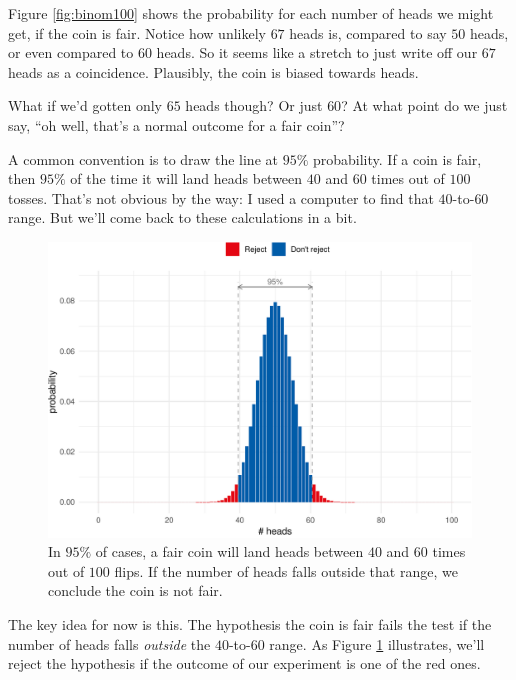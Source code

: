 \documentclass[justified]{tufte-book}
\theoremstyle{definition}
\theoremstyle{definition}
\theoremstyle{definition}
\theoremstyle{remark}
\begin{document}
Figure \ref{fig:binom100} shows the probability for each number of heads we might get, if the coin is fair. Notice how unlikely \(67\) heads is, compared to say \(50\) heads, or even compared to \(60\) heads. So it seems like a stretch to just write off our \(67\) heads as a coincidence. Plausibly, the coin is biased towards heads.

What if we'd gotten only \(65\) heads though? Or just \(60\)? At what point do we just say, ``oh well, that's a normal outcome for a fair coin''?

A common convention is to draw the line at \(95\%\) probability. If a coin is fair, then \(95\%\) of the time it will land heads between \(40\) and \(60\) times out of \(100\) tosses. That's not obvious by the way: I used a computer to find that \(40\)-to-\(60\) range. But we'll come back to these calculations in a bit.

\begin{figure}
\includegraphics{_main_files/figure-latex/binom100fences-1} \caption[In $95\%$ of cases, a fair coin will land heads between $40$ and $60$ times out of $100$ flips]{In $95\%$ of cases, a fair coin will land heads between $40$ and $60$ times out of $100$ flips. If the number of heads falls outside that range, we conclude the coin is not fair.}\label{fig:binom100fences}
\end{figure}

The key idea for now is this. The hypothesis the coin is fair fails the test if the number of heads falls \emph{outside} the \(40\)-to-\(60\) range. As Figure \ref{fig:binom100fences} illustrates, we'll reject the hypothesis if the outcome of our experiment is one of the red ones.
\end{document}
